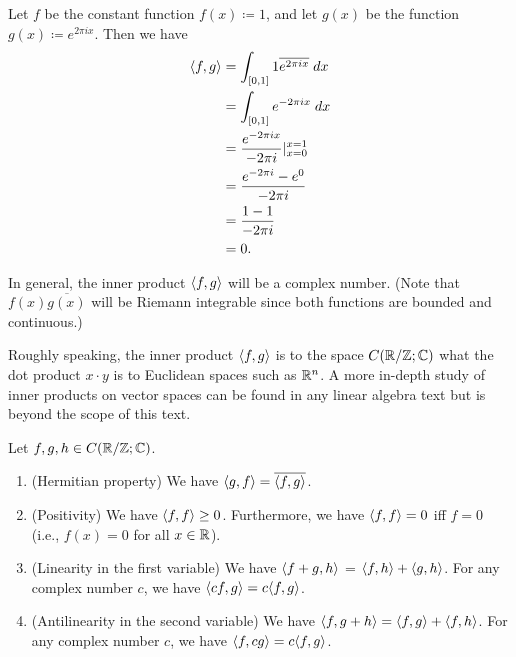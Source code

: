 \begin{eg}\label{ii:5.2.3}
  Let \(f\) be the constant function \(f(x) \coloneqq 1\), and let \(g(x)\) be the function \(g(x) \coloneqq e^{2 \pi i x}\).
  Then we have
  \begin{align*}
    \inner*{f, g} & = \int_{[0, 1]} 1 \overline{e^{2 \pi i x}} \; dx       \\
                  & = \int_{[0, 1]} e^{- 2 \pi i x} \; dx                  \\
                  & = \dfrac{e^{- 2 \pi i x}}{- 2 \pi i} |_{x = 0}^{x = 1} \\
                  & = \dfrac{e^{- 2 \pi i } - e^0}{- 2 \pi i}              \\
                  & = \dfrac{1 - 1}{- 2 \pi i}                             \\
                  & = 0.
  \end{align*}
\end{eg}

\begin{rmk}\label{ii:5.2.4}
  In general, the inner product \(\inner*{f, g}\) will be a complex number.
  (Note that \(f(x) \overline{g(x)}\) will be Riemann integrable since both functions are bounded and continuous.)
\end{rmk}

\begin{note}
  Roughly speaking, the inner product \(\inner*{f, g}\) is to the space \(C(\R / \Z ; \C)\) what the dot product \(x \cdot y\) is to Euclidean spaces such as \(\R^n\).
  A more in-depth study of inner products on vector spaces can be found in any linear algebra text but is beyond the scope of this text.
\end{note}

\begin{lem}\label{ii:5.2.5}
  Let \(f, g, h \in C(\R / \Z ; \C)\).
  \begin{enumerate}
    \item\label{ii:5.2.5.a} (Hermitian property)
    We have \(\inner*{g, f} = \overline{\inner*{f, g}}\).
    \item\label{ii:5.2.5.b} (Positivity)
    We have \(\inner*{f, f} \geq 0\).
    Furthermore, we have \(\inner*{f, f} = 0\) iff \(f = 0\)
    (i.e., \(f(x) = 0\) for all \(x \in \R\)).
    \item\label{ii:5.2.5.c} (Linearity in the first variable)
    We have \(\inner*{f +g, h}\) = \(\inner*{f, h} + \inner*{g, h}\).
    For any complex number \(c\), we have \(\inner*{cf, g} = c \inner*{f, g}\).
    \item\label{ii:5.2.5.d} (Antilinearity in the second variable)
    We have \(\inner*{f, g + h} = \inner*{f, g} + \inner*{f, h}\).
    For any complex number \(c\), we have \(\inner*{f, cg} = c \inner*{f, g}\).
  \end{enumerate}
\end{lem}

